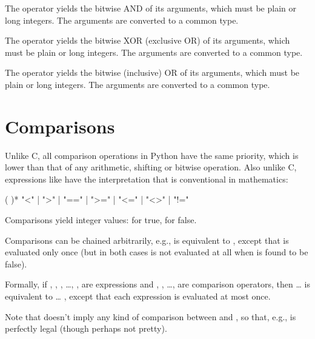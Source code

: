 The \code{\&} operator yields the bitwise AND of its arguments, which
must be plain or long integers.  The arguments are converted to a
common type.

The \code{\^} operator yields the bitwise XOR (exclusive OR) of its
arguments, which must be plain or long integers.  The arguments are
converted to a common type.

The \code{|} operator yields the bitwise (inclusive) OR of its
arguments, which must be plain or long integers.  The arguments are
converted to a common type.


\section{Comparisons\label{comparisons}}

Unlike C, all comparison operations in Python have the same priority,
which is lower than that of any arithmetic, shifting or bitwise
operation.  Also unlike C, expressions like  have the
interpretation that is conventional in mathematics:

\begin{productionlist}
             { (   )*}
             {"<" | ">" | "==" | ">=" | "<=" | "<>" | "!="}
\end{productionlist}

Comparisons yield integer values:  for true,  for false.

Comparisons can be chained arbitrarily, e.g.,  is
equivalent to , except that  is
evaluated only once (but in both cases  is not evaluated at all
when  is found to be false).

Formally, if , , , \ldots, ,  are
expressions and , , \ldots,  are comparison
operators, then  \ldots {} is equivalent
to     \ldots
{}, except that each expression is evaluated at most once.

Note that  doesn't imply any kind of comparison
between  and , so that, e.g.,  is
perfectly legal (though perhaps not pretty).


